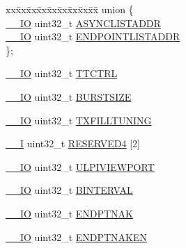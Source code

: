 \begin{DoxyCompactItemize}
\begin{tabbing}
\end{tabbing}\item 
\begin{tabbing}
xx\=xx\=xx\=xx\=xx\=xx\=xx\=xx\=xx\=\kill
union \{\\
\>\hyperlink{core__sc300_8h_aec43007d9998a0a0e01faede4133d6be}{\_\_IO} uint32\_t \hyperlink{struct_l_p_c___u_s_b_h_s___t_a35cade72e7f9a9325a395f75713d7cb1}{ASYNCLISTADDR}\\
\>\hyperlink{core__sc300_8h_aec43007d9998a0a0e01faede4133d6be}{\_\_IO} uint32\_t \hyperlink{struct_l_p_c___u_s_b_h_s___t_a31aa0d7994e5438aed6c5958cee75fc1}{ENDPOINTLISTADDR}\\
\}; \\

\end{tabbing}\item 
\hyperlink{core__sc300_8h_aec43007d9998a0a0e01faede4133d6be}{\+\_\+\+\_\+\+IO} uint32\+\_\+t \hyperlink{struct_l_p_c___u_s_b_h_s___t_ab302a4d9f71b57baba16464d48ec27ee}{T\+T\+C\+T\+RL}
\item 
\hyperlink{core__sc300_8h_aec43007d9998a0a0e01faede4133d6be}{\+\_\+\+\_\+\+IO} uint32\+\_\+t \hyperlink{struct_l_p_c___u_s_b_h_s___t_ab72fdfdd744985d89bc84fb1dc67ef2c}{B\+U\+R\+S\+T\+S\+I\+ZE}
\item 
\hyperlink{core__sc300_8h_aec43007d9998a0a0e01faede4133d6be}{\+\_\+\+\_\+\+IO} uint32\+\_\+t \hyperlink{struct_l_p_c___u_s_b_h_s___t_a6143b08b7f423f2a0a409e3f2d88c543}{T\+X\+F\+I\+L\+L\+T\+U\+N\+I\+NG}
\item 
\hyperlink{core__sc300_8h_af63697ed9952cc71e1225efe205f6cd3}{\+\_\+\+\_\+I} uint32\+\_\+t \hyperlink{struct_l_p_c___u_s_b_h_s___t_af61d1d0318c52b7838b5c0a769284bc1}{R\+E\+S\+E\+R\+V\+E\+D4} \mbox{[}2\mbox{]}
\item 
\hyperlink{core__sc300_8h_aec43007d9998a0a0e01faede4133d6be}{\+\_\+\+\_\+\+IO} uint32\+\_\+t \hyperlink{struct_l_p_c___u_s_b_h_s___t_a2cac62cccdc03b393c50ed87f9fc9fa1}{U\+L\+P\+I\+V\+I\+E\+W\+P\+O\+RT}
\item 
\hyperlink{core__sc300_8h_aec43007d9998a0a0e01faede4133d6be}{\+\_\+\+\_\+\+IO} uint32\+\_\+t \hyperlink{struct_l_p_c___u_s_b_h_s___t_ad4f61c0b53d49e50aeac9bd7b95d838e}{B\+I\+N\+T\+E\+R\+V\+AL}
\item 
\hyperlink{core__sc300_8h_aec43007d9998a0a0e01faede4133d6be}{\+\_\+\+\_\+\+IO} uint32\+\_\+t \hyperlink{struct_l_p_c___u_s_b_h_s___t_a8105974fdaa8c466a073aef524fac8a5}{E\+N\+D\+P\+T\+N\+AK}
\item 
\hyperlink{core__sc300_8h_aec43007d9998a0a0e01faede4133d6be}{\+\_\+\+\_\+\+IO} uint32\+\_\+t \hyperlink{struct_l_p_c___u_s_b_h_s___t_a7a4edabf92885cf4497c93a82558d43d}{E\+N\+D\+P\+T\+N\+A\+K\+EN}

\end{DoxyCompactItemize}
